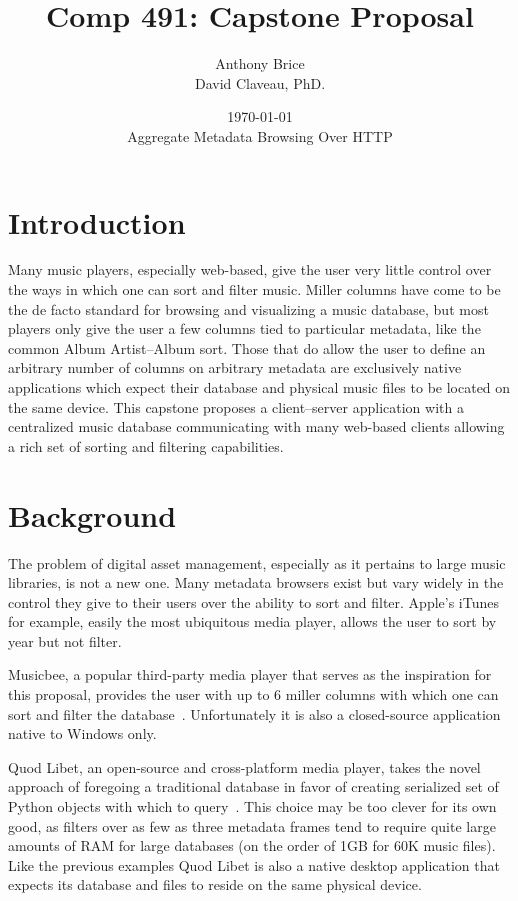 \documentclass{abrice}
\title{Comp 491: Capstone Proposal}
\author{Anthony Brice\protect\\\medskip David Claveau, PhD.}
\date{\today\protect\\ \bigskip Aggregate Metadata Browsing Over HTTP}
\begin{document}
\maketitle

\section{Introduction}

Many music players, especially web-based, give the user very little control
over the ways in which one can sort and filter music. Miller columns have come
to be the de facto standard for browsing and visualizing a music database, but
most players only give the user a few columns tied to particular metadata, like
the common Album Artist--Album sort. Those that do allow the user to define an
arbitrary number of columns on arbitrary metadata are exclusively native
applications which expect their database and physical music files to be located
on the same device. This capstone proposes a client--server application with a
centralized music database communicating with many web-based clients allowing a
rich set of sorting and filtering capabilities.

\section{Background}

The problem of digital asset management, especially as it pertains to large
music libraries, is not a new one. Many metadata browsers exist but vary widely
in the control they give to their users over the ability to sort and
filter. Apple's iTunes for example, easily the most ubiquitous media player,
allows the user to sort by year but not filter.

Musicbee, a popular third-party media player that serves as the inspiration for
this proposal, provides the user with up to 6 miller columns with which one can
sort and filter the database~\cite{musicbee}. Unfortunately it is also a
closed-source application native to Windows only.

Quod Libet, an open-source and cross-platform media player, takes the novel
approach of foregoing a traditional database in favor of creating serialized set
of Python objects with which to query~\cite{quodlibet}. This choice may be too
clever for its own good, as filters over as few as three metadata frames tend to
require quite large amounts of RAM for large databases (on the order of 1GB for
60K music files). Like the previous examples Quod Libet is also a native desktop
application that expects its database and files to reside on the same physical
device.
\end{document}
